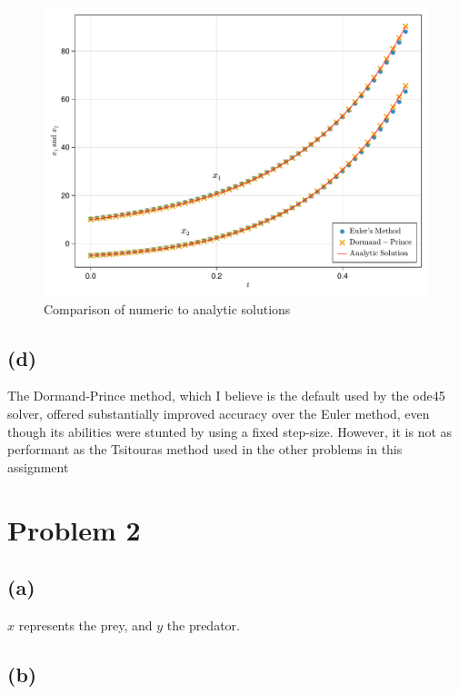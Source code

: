 \documentclass[a4paper, british]{article}
\begin{document}
\begin{figure}[H]
    \centering
    \includegraphics[width=\textwidth]{figures/f1.pdf}
    \caption{Comparison of numeric to analytic solutions}
    \label{fig:1}
\end{figure}



\subsection*{(d)}

The Dormand-Prince method, which I believe is the default used by the ode45 solver, offered substantially improved accuracy over the Euler method, even though its abilities were stunted by using a fixed step-size. However, it is not as performant as the Tsitouras method used in the other problems in this assignment

\newpage


\section{Problem 2}

\subsection*{(a)}

\(x\) represents the prey, and \(y\) the predator.

\subsection*{(b)}
\end{document}
